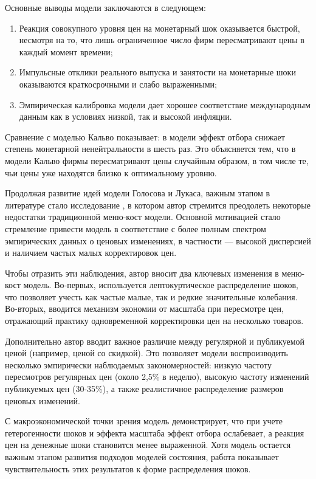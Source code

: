 Основные выводы модели \cite{golosov2007} заключаются в следующем:
\begin{enumerate}
	\item Реакция совокупного уровня цен на монетарный шок оказывается быстрой, несмотря на то, что лишь ограниченное число фирм пересматривают цены в каждый момент времени;
	\item Импульсные отклики реального выпуска и занятости на монетарные шоки оказываются краткосрочными и слабо выраженными;
	\item Эмпирическая калибровка модели дает хорошее соответствие международным данным как в условиях низкой, так и высокой инфляции.
\end{enumerate}

Сравнение с моделью Кальво показывает: в модели \cite{golosov2007} эффект отбора снижает степень монетарной ненейтральности в шесть раз. Это объясняется тем, что в модели Кальво фирмы пересматривают цены случайным образом, в том числе те, чьи цены уже находятся близко к оптимальному уровню.

Продолжая развитие идей модели Голосова и Лукаса, важным этапом в литературе стало исследование \cite{Midrigan2011}, в котором автор стремится преодолеть некоторые недостатки традиционной меню-кост модели. Основной мотивацией стало стремление привести модель в соответствие с более полным спектром эмпирических данных о ценовых изменениях, в частности — высокой дисперсией и наличием частых малых корректировок цен.

Чтобы отразить эти наблюдения, автор вносит два ключевых изменения в меню-кост модель. Во-первых, используется лептокуртическое распределение шоков, что позволяет учесть как частые малые, так и редкие значительные колебания. Во-вторых, вводится механизм экономии от масштаба при пересмотре цен, отражающий практику одновременной корректировки цен на несколько товаров.

Дополнительно автор \cite{Midrigan2011} вводит важное различие между регулярной и публикуемой ценой (например, ценой со скидкой). Это позволяет модели воспроизводить несколько эмпирически наблюдаемых закономерностей: низкую частоту пересмотров регулярных цен (около 2,5\% в неделю), высокую частоту изменений публикуемых цен (30-35\%), а также реалистичное распределение размеров ценовых изменений.

С макроэкономической точки зрения модель демонстрирует, что при учете гетерогенности шоков и эффекта масштаба эффект отбора ослабевает, а реакция цен на денежные шоки становится менее выраженной. Хотя модель \cite{golosov2007} остается важным этапом развития подходов моделей состояния, работа \cite{Midrigan2011} показывает чувствительность этих результатов к форме распределения шоков.

